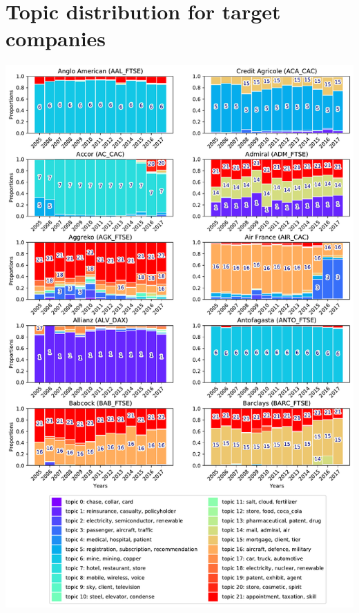 \documentclass[12pt,journal,letterpaper,oneside,onecolumn]{IEEEtran}
\begin{document}
%


\appendices

\section{Topic distribution for target companies}
\begin{center}
\includegraphics[width=0.85\linewidth]{images/companies_on_page_0.pdf}
\end{center}
\end{document}
